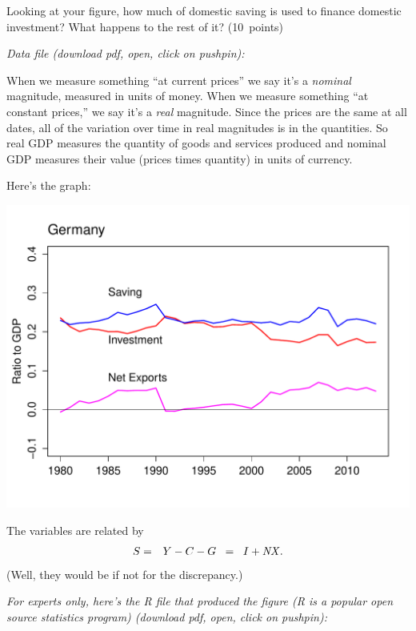 \documentclass[12pt]{exam}
\newcommand{\NX}{\mbox{\it NX\/}}
\begin{document}
\begin{questions}
\begin{parts}
\item Looking at your figure,
how much of domestic saving is used to finance domestic investment?
What happens to the rest of it?
(10~points)
\end{parts}

{\it Data file (download pdf, open, click on pushpin): }

\begin{solution}
\begin{parts}
\item When we measure something ``at current prices''
we say it's a {\it nominal\/} magnitude, measured in units of money.
When we measure something ``at constant prices,''
we say it's a {\it real\/} magnitude.
Since the prices are the same at all dates,
all of the variation over time in real magnitudes is in the quantities.
So real GDP measures the quantity of goods and services produced
and nominal GDP measures their value (prices times quantity)
in units of currency.

\item Here's the graph:
\begin{center}
\includegraphics[scale=0.5]{Germany_shares.pdf}
\end{center}
%
The variables are related by
\begin{eqnarray*}
        S &=& Y - C - G \;\;=\;\; I + \NX .
\end{eqnarray*}
(Well, they would be if not for the discrepancy.)

{\it For experts only, here's the R file that produced the figure
(R is a popular open source statistics program)
(download pdf, open, click on pushpin): }



\end{parts}
\end{solution}
\end{questions}
\end{document}
